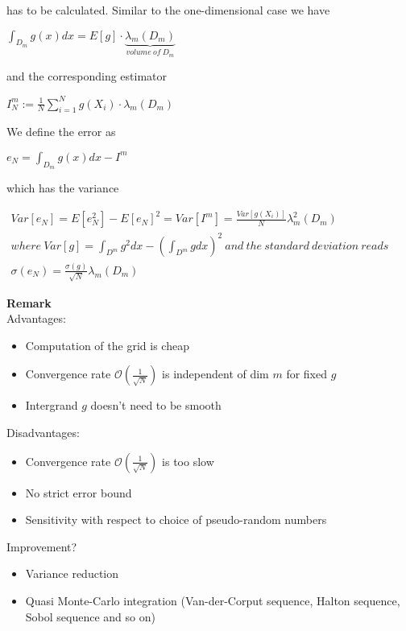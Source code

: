 \documentclass{article}
\begin{document}
has to be calculated. Similar to the one-dimensional case we have
\begin{center}
	$\int^{}_{D_{m}} g\left( x\right)  dx=E\left[ g\right]  \cdot \underbrace{\lambda_{m} \left( D_{m}\right)  }_{volume\  of\  D_{m}}$
\end{center}
and the corresponding estimator
\begin{center}
	$I^{m}_{N}:=\frac{1}{N} \sum^{N}_{i=1} g\left( X_{i}\right)  \cdot \lambda_{m} \left( D_{m}\right)  $
\end{center}
We define the error as
\begin{center}
	$e_{N}=\int^{}_{D_{m}} g\left( x\right)  dx-I^{m}$
\end{center}
which has the variance
\begin{center}
	$\begin{gathered}Var\left[ e_{N}\right]  =E\left[ e^{2}_{N}\right]  -E\left[ e_{N}\right]^{2}  =Var\left[ I^{m}\right]  =\frac{Var\left[ g\left( X_{i}\right)  \right]  }{N} \lambda^{2}_{m} \left( D_{m}\right)  \\ where\  Var\left[ g\right]  =\int^{}_{D^{m}} g^{2}dx-\left( \int^{}_{D^{m}} gdx\right)^{2}  \  and\  the\  standard\  deviation\  reads\\ \sigma \left( e_{N}\right)  =\frac{\sigma \left( g\right)  }{\sqrt{N} } \lambda_{m} \left( D_{m}\right)  \end{gathered}$
\end{center}
\textbf{Remark}\\
Advantages:
\begin{itemize}
	\item Computation of the grid is cheap
	\item Convergence rate $\mathcal{O} \left( \frac{1}{\sqrt{N} } \right)$ is independent of dim $m$ for fixed $g$
	\item Intergrand $g$ doesn't need to be smooth
\end{itemize}
Disadvantages:
\begin{itemize}
	\item Convergence rate $\mathcal{O} \left( \frac{1}{\sqrt{N} } \right)$ is too slow
	\item No strict error bound
	\item Sensitivity with respect to choice of pseudo-random numbers
\end{itemize}
Improvement?
\begin{itemize}
	\item Variance reduction
	\item Quasi Monte-Carlo integration (Van-der-Corput sequence, Halton sequence, Sobol sequence and so on)
\end{itemize}
\end{document}
